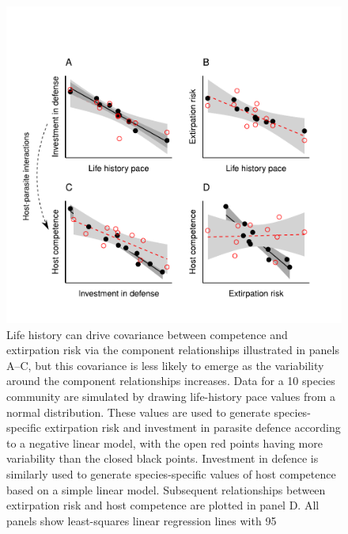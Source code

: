 \begin{figure}
	\caption[Life-history basis for covariance between extirpation risk and host competence]{
	Life history can drive covariance between competence and extirpation risk via the component relationships illustrated in panels A–C, but this covariance is less likely to emerge as the variability around the component relationships increases. Data for a 10 species community are simulated by drawing life-history pace values from a normal distribution. These values are used to generate species-specific extirpation risk and investment in parasite defence according to a negative linear model, with the open red points having more variability than the closed black points. Investment in defence is similarly used to generate species-specific values of host competence based on a simple linear model. Subsequent relationships between extirpation risk and host competence are plotted in panel D. All panels show least-squares linear regression lines with 95%
	}
    \begin{center}
	\includegraphics[width=150mm]{figs/ch2/fig1.pdf}
    \end{center}
\label{2-1}
\end{figure}


